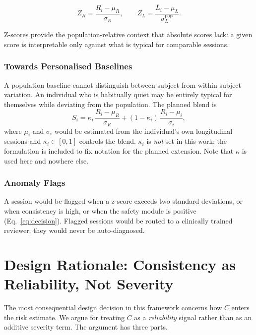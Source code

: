 \documentclass[12pt]{article}
\begin{document}
\begin{equation}
Z_R = \frac{R_i - \mu_R}{\sigma_R},
\qquad
Z_L = \frac{\bar{L}_i - \mu_L}{\sigma^{\text{pop}}_{L}} .
\end{equation}

\noindent Z-scores provide the population-relative context that absolute
scores lack: a given score is interpretable only against what is typical
for comparable sessions.

\subsubsection{Towards Personalised Baselines}

A population baseline cannot distinguish between-subject from
within-subject variation. An individual who is habitually quiet may be
entirely typical for themselves while deviating from the population. The
planned blend is
\begin{equation}
S_i = \kappa_i\,\frac{R_i - \mu_R}{\sigma_R}
    + (1-\kappa_i)\,\frac{R_i - \mu_i}{\sigma_i},
\end{equation}
where $\mu_i$ and $\sigma_i$ would be estimated from the individual's
own longitudinal sessions and $\kappa_i \in [0,1]$ controls the blend.
$\kappa_i$ is \emph{not} set in this work; the formulation is included to
fix notation for the planned extension. Note that $\kappa$ is used here
and nowhere else.

\subsubsection{Anomaly Flags}

A session would be flagged when a z-score exceeds two standard
deviations, or when consistency is high, or when the safety module is
positive (Eq.~\ref{eq:decision}). Flagged sessions would be routed to a
clinically trained reviewer; they would never be auto-diagnosed.

\section{Design Rationale: Consistency as Reliability, Not Severity}
\label{sec:dualrole}

The most consequential design decision in this framework concerns how
$C$ enters the risk estimate. We argue for treating $C$ as a
\emph{reliability} signal rather than as an additive severity term. The
argument has three parts.
\end{document}
